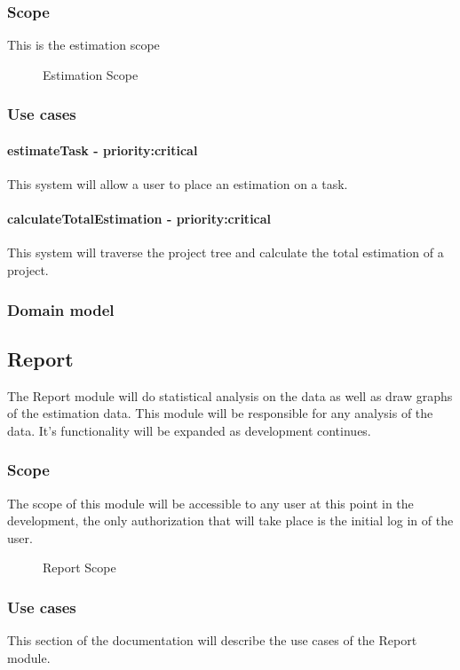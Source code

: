 \subsubsection{Scope}
	This is the estimation scope
	\begin{figure}[H]
	    	\centering
	    	\caption{Estimation Scope}
	    	\label{fig:Estimation_Scope}
   	\end{figure}
\subsubsection{Use cases}
	\paragraph{estimateTask - priority:critical}This system will allow a user to place an estimation on a task.
	\paragraph{calculateTotalEstimation - priority:critical}This system will traverse the project tree and calculate the total estimation of a project.
\subsubsection{Domain model}
\subsection{Report}
The Report module will do statistical analysis on the data as well as draw graphs of the estimation data. This module will be responsible for any analysis of the data. It's functionality will be expanded as development continues.
\subsubsection{Scope}
The scope of this module will be accessible to any user at this point in the development, the only authorization that will take place is the initial log in of the user.
	\begin{figure}[H]
	    	\centering
	    	\caption{Report Scope}
	    	\label{fig:Report_Scope.png}
   	\end{figure}
\subsubsection{Use cases}
	This section of the documentation will describe the use cases of the Report module.
